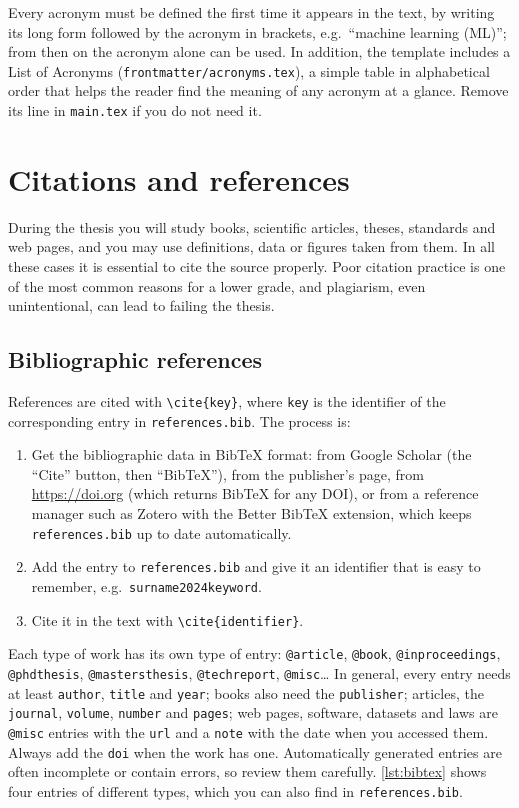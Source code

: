 Every acronym must be defined the first time it appears in the text, by writing its long
form followed by the acronym in brackets, e.g.\ \enquote{machine learning (ML)}; from then on
the acronym alone can be used. In addition, the template includes a List of Acronyms
(\texttt{frontmatter/acronyms.tex}), a simple table in alphabetical order that helps the
reader find the meaning of any acronym at a glance. Remove its \verb|| line in
\texttt{main.tex} if you do not need it.

\section{Citations and references}\label{sec:citations}

During the thesis you will study books, scientific articles, theses, standards and web
pages, and you may use definitions, data or figures taken from them. In all these cases it is
essential to cite the source properly. Poor citation practice is one of the most common
reasons for a lower grade, and plagiarism, even unintentional, can lead to failing the
thesis.

\subsection{Bibliographic references}\label{sec:bibliography}

References are cited with \verb|\cite{key}|, where \texttt{key} is the identifier of the
corresponding entry in \texttt{references.bib}. The process is:

\begin{enumerate}
  \item Get the bibliographic data in BibTeX format: from Google Scholar (the
        \enquote{Cite} button, then \enquote{BibTeX}), from the publisher's page, from
        \url{https://doi.org} (which returns BibTeX for any DOI), or from a reference
        manager such as Zotero with the Better BibTeX extension, which keeps
        \texttt{references.bib} up to date automatically.
  \item Add the entry to \texttt{references.bib} and give it an identifier that is easy to
        remember, e.g.\ \texttt{surname2024keyword}.
  \item Cite it in the text with \verb|\cite{identifier}|.
\end{enumerate}

Each type of work has its own type of entry: \texttt{@article}, \texttt{@book},
\texttt{@inproceedings}, \texttt{@phdthesis}, \texttt{@mastersthesis},
\texttt{@techreport}, \texttt{@misc}\dots{} In general, every entry needs at least
\texttt{author}, \texttt{title} and \texttt{year}; books also need the \texttt{publisher};
articles, the \texttt{journal}, \texttt{volume}, \texttt{number} and \texttt{pages}; web
pages, software, datasets and laws are \texttt{@misc} entries with the \texttt{url} and a
\texttt{note} with the date when you accessed them. Always add the \texttt{doi} when the
work has one. Automatically generated entries are often incomplete or contain errors, so
review them carefully. \autoref{lst:bibtex} shows four entries of different types, which you
can also find in \texttt{references.bib}.

